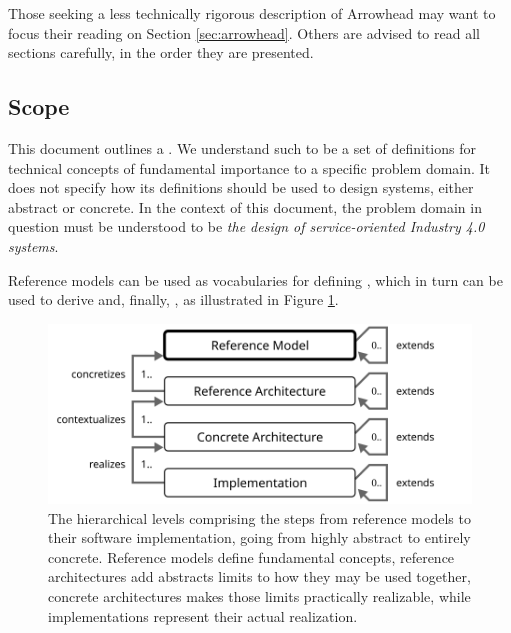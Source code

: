 Those seeking a less technically rigorous description of Arrowhead may want to focus their reading on Section \ref{sec:arrowhead}.
Others are advised to read all sections carefully, in the order they are presented.

\subsection{Scope}
\label{sec:introduction:scope}

This document outlines a .
We understand such to be a set of definitions for technical concepts of fundamental importance to a specific problem domain.
It does not specify how its definitions should be used to design systems, either abstract or concrete.
In the context of this document, the problem domain in question must be understood to be \textit{the design of service-oriented Industry 4.0 systems}.

Reference models can be used as vocabularies for defining , which in turn can be used to derive  and, finally, , as illustrated in Figure \ref{fig:reference-model}.

\vspace*{\fill}

\begin{figure}[ht]
  \centering
  \includegraphics{figures/reference-model}
  \caption{
    The hierarchical levels comprising the steps from reference models to their software implementation, going from highly abstract to entirely concrete.
    Reference models define fundamental concepts, reference architectures add abstracts limits to how they may be used together, concrete architectures makes those limits practically realizable, while implementations represent their actual realization.
  }
  \label{fig:reference-model}
\end{figure}

